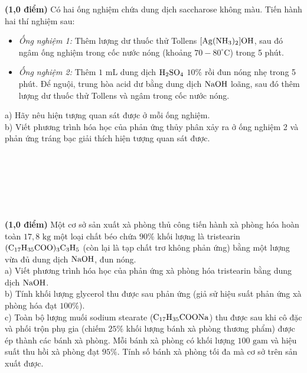 \documentclass[11pt,a4paper]{article}
\begin{document}
\begin{ex}
\textbf{(1,0 điểm)} Có hai ống nghiệm chứa dung dịch saccharose không màu. Tiến hành hai thí nghiệm sau:
\begin{itemize}[leftmargin=1.5cm,itemsep=1pt]
\item \textit{Ống nghiệm 1:} Thêm lượng dư thuốc thử Tollens $[\ce{Ag(NH3)2}]\ce{OH}$, sau đó ngâm ống nghiệm trong cốc nước nóng (khoảng $70 - 80^\circ\text{C}$) trong 5 phút.
\item \textit{Ống nghiệm 2:} Thêm $1\text{ mL}$ dung dịch $\ce{H2SO4}$ $10\%$ rồi đun nóng nhẹ trong 5 phút. Để nguội, trung hòa acid dư bằng dung dịch $\ce{NaOH}$ loãng, sau đó thêm lượng dư thuốc thử Tollens và ngâm trong cốc nước nóng.
\end{itemize}
a) Hãy nêu hiện tượng quan sát được ở mỗi ống nghiệm.\\
b) Viết phương trình hóa học của phản ứng thủy phân xảy ra ở ống nghiệm 2 và phản ứng tráng bạc giải thích hiện tượng quan sát được.

\vspace{0.2cm}
\dotfill\\
\dotfill\\
\dotfill\\
\dotfill\\
\dotfill\\
\dotfill
\end{ex}
\begin{ex}
\textbf{(1,0 điểm)} Một cơ sở sản xuất xà phòng thủ công tiến hành xà phòng hóa hoàn toàn $17{,}8\text{ kg}$ một loại chất béo chứa $90\%$ khối lượng là tristearin $\ce{(C17H35COO)3C3H5}$ (còn lại là tạp chất trơ không phản ứng) bằng một lượng vừa đủ dung dịch $\ce{NaOH}$, đun nóng.\\
a) Viết phương trình hóa học của phản ứng xà phòng hóa tristearin bằng dung dịch $\ce{NaOH}$.\\
b) Tính khối lượng glycerol thu được sau phản ứng (giả sử hiệu suất phản ứng xà phòng hóa đạt $100\%$).\\
c) Toàn bộ lượng muối sodium stearate ($\ce{C17H35COONa}$) thu được sau khi cô đặc và phối trộn phụ gia (chiếm $25\%$ khối lượng bánh xà phòng thương phẩm) được ép thành các bánh xà phòng. Mỗi bánh xà phòng có khối lượng $100\text{ gam}$ và hiệu suất thu hồi xà phòng đạt $95\%$. Tính số bánh xà phòng tối đa mà cơ sở trên sản xuất được.

\vspace{0.2cm}
\dotfill\\
\dotfill\\
\dotfill\\
\dotfill\\
\dotfill\\
\dotfill
\end{ex}
\end{document}
